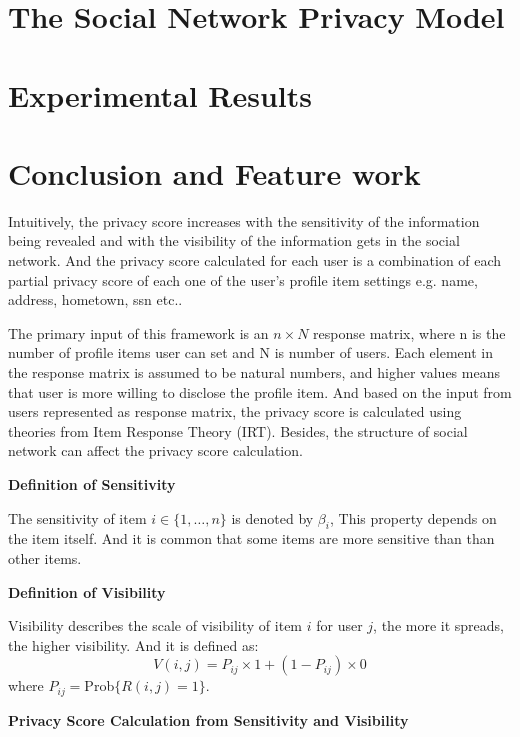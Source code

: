 \documentclass[a4paper]{article}
\begin{document}
\section{The Social Network Privacy Model} 
% 

\section{Experimental Results }

\section{Conclusion and Feature work}

Intuitively,
the privacy score increases with the sensitivity of the information
being revealed and with the visibility of the information gets in the
social network. And the privacy score calculated for each user is a
combination of each partial privacy score of each one of the user's
profile item settings e.g. name, address, hometown, ssn etc..

The primary input of this framework is an $n\times N$ response matrix,
where n is the number of profile items user can set and N is number of
users. Each element in the response matrix is assumed to be natural
numbers, and higher values means that user is more willing to disclose
the profile item. And based on the input from users represented as
response matrix, the privacy score is calculated using theories from
Item Response Theory (IRT). Besides, the structure of social network
can affect the privacy score calculation. 

\textbf{Definition of Sensitivity} 

The sensitivity of item $i\in \{1,\ldots,n\}$ is denoted by $\beta_i$,
This property depends on the item itself. And it is common that some
items are more sensitive than than other items. 

\textbf{Definition of Visibility}

Visibility describes the scale of visibility of item $i$ for user $j$,
the more it spreads, the higher visibility. And it is defined as: 
\begin{equation}
\label{equ:org:visibility}
V(i,j) = P_{ij}\times 1 + (1-P_{ij})\times 0
\end{equation}
where $P_{ij}=$Prob$\{R(i,j)=1\}$.

\textbf{Privacy Score Calculation from Sensitivity and Visibility}
\end{document}
